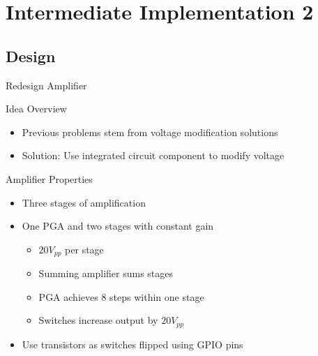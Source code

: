 \section{Intermediate Implementation 2}

\subsection{Design}

\begin{frame}{Redesign Amplifier}
  \begin{block}{Idea Overview}
  \begin{itemize}
    \item Previous problems stem from voltage modification solutions
    \item Solution: Use integrated circuit component to modify voltage
  \end{itemize}
  \end{block}

  \begin{block}{Amplifier Properties}
  \begin{itemize}
    \item Three stages of amplification
    \item One PGA and two stages with constant gain
      \begin{itemize}
        \item $20V_{pp}$ per stage
        \item Summing amplifier sums stages
        \item PGA achieves 8 steps within one stage
        \item Switches increase output by $20V_{pp}$
      \end{itemize}
    \item Use transistors as switches flipped using GPIO pins
  \end{itemize}
  \end{block}

\end{frame}

